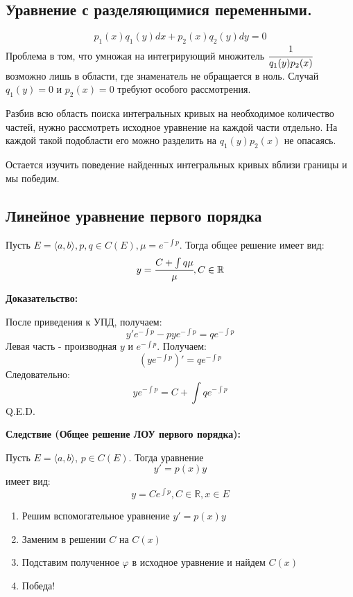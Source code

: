 \subsection{Уравнение с разделяющимися переменными.}

$$p_1(x)q_1(y)dx + p_2(x) q_2(y)dy = 0$$
Проблема в том, что умножая на интегрирующий множитель $\cfrac{1}{q_1(y)p_2(x)}$ возможно лишь в области, где знаменатель не обращается в ноль. Случай $q_1(y) =0$ и $p_2(x) =0$ требуют особого рассмотрения.

Разбив всю область поиска интегральных кривых на необходимое количество частей, нужно рассмотреть исходное уравнение на каждой части отдельно. На каждой такой подобласти его можно разделить на $q_1(y)p_2(x)$ не опасаясь.

Остается изучить поведение найденных интегральных кривых вблизи границы и мы победим.

\subsection{Линейное уравнение первого порядка}


Пусть $E = \langle a,b\rangle,p,q\in C(E), \mu = e^{-\int p}$. Тогда общее решение имеет вид:
$$y = \cfrac{C+ \int q\mu}{\mu}, C \in \mathbb{R}$$

\textbf{Доказательство:}

После приведения к УПД, получаем:
$$y'e^{-\int p}-p y e^{- \int p}= qe^{-\int p}$$
Левая часть - производная $y$ и $e^{-\int p}$. Получаем:
$$(y e^{-\int p})' = q e^{-\int p} $$
Следовательно:
$$ye^{-\int p} = C + \int qe^{-\int p}$$
\hfill Q.E.D.


\textbf{Следствие (Общее решение ЛОУ первого порядка):}

Пусть $E = \langle a,b \rangle$, $p \in C(E)$. Тогда уравнение $$y'=p(x)y$$
имеет вид:
$$y = C e^{\int p}, C\in \mathbb{R}, x\in E$$


\begin{enumerate}
    \item Решим вспомогательное уравнение $y' = p(x)y$
    \item Заменим в решении $C$ на $C(x)$
    \item Подставим полученное $\varphi$ в исходное уравнение и найдем $C(x)$
    \item Победа!
\end{enumerate}


